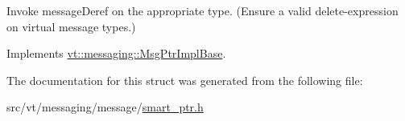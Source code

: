 Invoke message\+Deref on the appropriate type. (Ensure a valid delete-\/expression on virtual message types.) 

Implements \hyperlink{structvt_1_1messaging_1_1_msg_ptr_impl_base_a654574717593bf92d031c055731ef41e}{vt\+::messaging\+::\+Msg\+Ptr\+Impl\+Base}.



The documentation for this struct was generated from the following file\+:\begin{DoxyCompactItemize}
\item 
src/vt/messaging/message/\hyperlink{smart__ptr_8h}{smart\+\_\+ptr.\+h}\end{DoxyCompactItemize}
